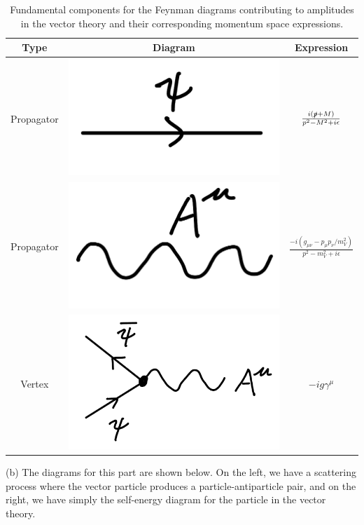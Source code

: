 {\begin{table}[h!tb]
\centering
\begin{tabular}{|c|c|c|}
    \hline
    Type & Diagram & Expression \\
    \hline
    Propagator & \includegraphics[width=0.2\linewidth]{D_prop.jpeg} & $\frac{i( \slashed{p} + M )}{p^2 - M^2 + i \epsilon}$ \\
    \hline
    Propagator & \includegraphics[width=0.2\linewidth]{P_prop.jpeg} & $\frac{-i ( g_{\mu\nu} - p_{\mu} p_{\nu} / m_{V}^2 )}{p^2 - m_{V}^2 + i \epsilon}$ \\
    \hline
    Vertex & \includegraphics[width=0.2\linewidth]{V_int.jpeg} & $- i g \gamma^{\mu}$ \\
    \hline
\end{tabular}
\caption{Fundamental components for the Feynman diagrams contributing to amplitudes in the vector theory and their corresponding momentum space expressions.}
\label{tab:Feynman-rules-V}
\end{table}


(b) The diagrams for this part are shown below.
On the left, we have a scattering process where the vector particle produces a particle-antiparticle pair, and on the right, we have simply the self-energy diagram for the particle in the vector theory.

\begin{center}
\end{center}

}
